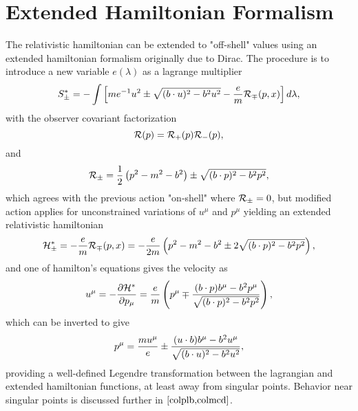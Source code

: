 \documentclass[a4paper]{jpconf}
\def\la{\lambda}
\newcommand{\beq}{\begin{displaymath}}
\newcommand{\eeq}{\end{displaymath}}
\begin{document}
\section{Extended Hamiltonian Formalism} 
The relativistic hamiltonian can be extended to "off-shell" values using an extended hamiltonian
formalism originally due to Dirac.  
The procedure is to introduce a new variable $e(\la)$ as a lagrange multiplier \cite{colplb}
\beq
S^*_\pm = - \int \left[ m e^{-1} u^2 \pm \sqrt{(b\cdot u)^2 - b^2 u^2} -
{e \over m} {\cal R}_\mp (p,x) \right ] d \lambda, 
\eeq
with the observer covariant factorization
\beq
{\cal R}(p) = {\cal R}_+(p) {\cal R}_-(p),
\eeq
and
\beq
{\cal R}_\pm = {1 \over 2} \left( p^2 - m^2 - b^2 \right) \pm \sqrt{(b \cdot p)^2 - b^2 p^2},
\eeq
which agrees with the previous action "on-shell" where ${\cal R}_\pm = 0$, but modified action 
applies for unconstrained variations of $u^\mu$ and $p^\mu$ yielding an extended
relativistic hamiltonian 
\beq
{\cal H}^*_\pm =  -{e \over m}{\cal R}_\mp (p,x)
= - {e \over 2 m} \left( p^2 - m^2 - b^2 \pm 2 \sqrt{(b \cdot p)^2 - b^2 p^2}\right),
\eeq
and one of hamilton's equations gives the velocity as
\beq
u^\mu = - {\partial {\cal H}^* \over \partial p_\mu} 
= {e \over m} \left( p^\mu \mp {(b \cdot p)b^\mu - b^2 p^\mu \over 
\sqrt{(b \cdot p)^2 - b^2 p^2}}\right),
\eeq
which can be inverted to give
\beq
p^\mu = {m u^\mu \over e} \pm {(u \cdot b) b^\mu - b^2 u^\mu \over \sqrt{(b \cdot u)^2 - b^2 u^2}},
\eeq
providing a well-defined Legendre transformation between the lagrangian and extended 
hamiltonian functions, at least away from singular points.  
Behavior near singular points is discussed further in $\cite{colplb,colmcd}$.
\end{document}
